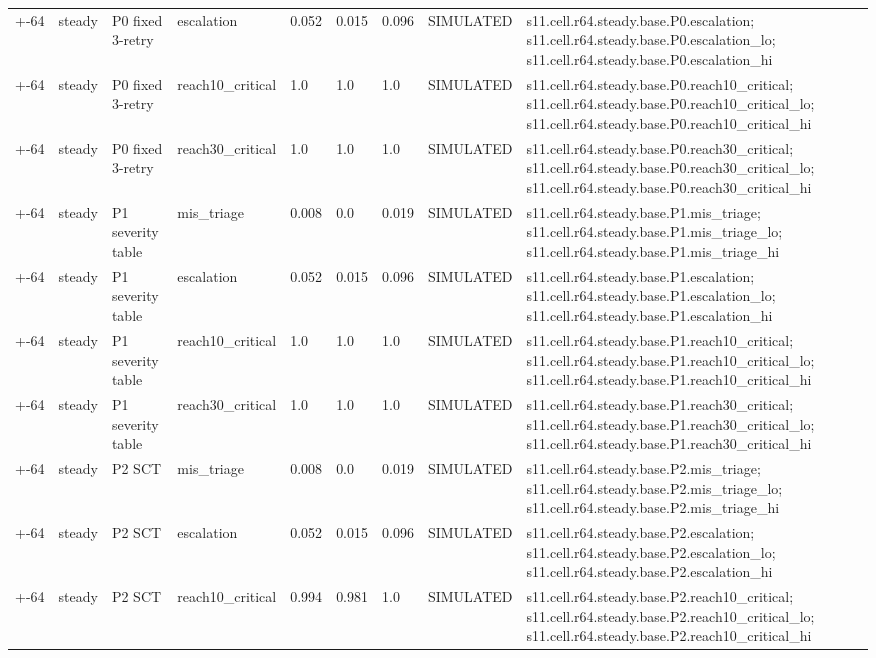 \begin{table}[t]
\begin{tabular}{lllllllll}
+-64 & steady & P0 fixed 3-retry & escalation & 0.052 & 0.015 & 0.096 & SIMULATED & s11.cell.r64.steady.base.P0.escalation; s11.cell.r64.steady.base.P0.escalation\_lo; s11.cell.r64.steady.base.P0.escalation\_hi \\
+-64 & steady & P0 fixed 3-retry & reach10\_critical & 1.0 & 1.0 & 1.0 & SIMULATED & s11.cell.r64.steady.base.P0.reach10\_critical; s11.cell.r64.steady.base.P0.reach10\_critical\_lo; s11.cell.r64.steady.base.P0.reach10\_critical\_hi \\
+-64 & steady & P0 fixed 3-retry & reach30\_critical & 1.0 & 1.0 & 1.0 & SIMULATED & s11.cell.r64.steady.base.P0.reach30\_critical; s11.cell.r64.steady.base.P0.reach30\_critical\_lo; s11.cell.r64.steady.base.P0.reach30\_critical\_hi \\
+-64 & steady & P1 severity table & mis\_triage & 0.008 & 0.0 & 0.019 & SIMULATED & s11.cell.r64.steady.base.P1.mis\_triage; s11.cell.r64.steady.base.P1.mis\_triage\_lo; s11.cell.r64.steady.base.P1.mis\_triage\_hi \\
+-64 & steady & P1 severity table & escalation & 0.052 & 0.015 & 0.096 & SIMULATED & s11.cell.r64.steady.base.P1.escalation; s11.cell.r64.steady.base.P1.escalation\_lo; s11.cell.r64.steady.base.P1.escalation\_hi \\
+-64 & steady & P1 severity table & reach10\_critical & 1.0 & 1.0 & 1.0 & SIMULATED & s11.cell.r64.steady.base.P1.reach10\_critical; s11.cell.r64.steady.base.P1.reach10\_critical\_lo; s11.cell.r64.steady.base.P1.reach10\_critical\_hi \\
+-64 & steady & P1 severity table & reach30\_critical & 1.0 & 1.0 & 1.0 & SIMULATED & s11.cell.r64.steady.base.P1.reach30\_critical; s11.cell.r64.steady.base.P1.reach30\_critical\_lo; s11.cell.r64.steady.base.P1.reach30\_critical\_hi \\
+-64 & steady & P2 SCT & mis\_triage & 0.008 & 0.0 & 0.019 & SIMULATED & s11.cell.r64.steady.base.P2.mis\_triage; s11.cell.r64.steady.base.P2.mis\_triage\_lo; s11.cell.r64.steady.base.P2.mis\_triage\_hi \\
+-64 & steady & P2 SCT & escalation & 0.052 & 0.015 & 0.096 & SIMULATED & s11.cell.r64.steady.base.P2.escalation; s11.cell.r64.steady.base.P2.escalation\_lo; s11.cell.r64.steady.base.P2.escalation\_hi \\
+-64 & steady & P2 SCT & reach10\_critical & 0.994 & 0.981 & 1.0 & SIMULATED & s11.cell.r64.steady.base.P2.reach10\_critical; s11.cell.r64.steady.base.P2.reach10\_critical\_lo; s11.cell.r64.steady.base.P2.reach10\_critical\_hi \\

\end{tabular}
\end{table}

